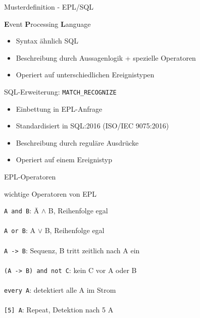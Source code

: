 \documentclass[usenames,dvipsnames]{beamer}
\begin{document}
        





\begin{frame}{Musterdefinition - EPL/SQL}

\begin{exampleblock}{\textbf{E}vent \textbf{P}rocessing \textbf{L}anguage}
    \begin{itemize}
        \item Syntax ähnlich SQL
        \item Beschreibung durch Aussagenlogik + spezielle Operatoren
        \item Operiert auf unterschiedlichen Ereignistypen
    \end{itemize}

\end{exampleblock}

\begin{exampleblock}{SQL-Erweiterung: \texttt{MATCH\_RECOGNIZE}}
\begin{itemize}
    \item Einbettung in EPL-Anfrage
    \item Standardisiert in SQL:2016 (ISO/IEC 9075:2016)
    \item Beschreibung durch reguläre Ausdrücke
    \item Operiert auf einem Ereignistyp
\end{itemize}
\end{exampleblock}
   
\end{frame}

\begin{frame}{EPL-Operatoren}

\begin{block}{\centering wichtige Operatoren von EPL}
    \begin{tabbing}
        \texttt{A and B}:\hspace{3cm}  \=   A $\land$ B, Reihenfolge egal\\\\
        \texttt{A or B}: \>     A $\lor$ B, Reihenfolge egal\\\\
        \texttt{A -> B}: \>     Sequenz, B tritt zeitlich nach A ein\\\\
        \texttt{(A -> B) and not C}: \>     kein C vor A oder B\\\\
        \texttt{every A}: \>        detektiert alle A im Strom\\\\
        \texttt{[5] A}: \> Repeat, Detektion nach 5 A          
        
    \end{tabbing}
\end{block}


\end{frame}
\end{document}
